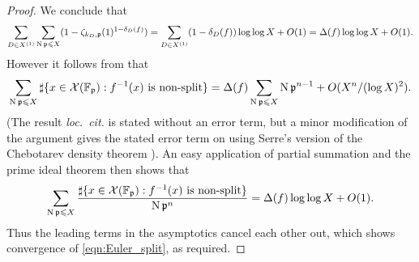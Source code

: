 \documentclass[a4paper,12pt,reqno]{amsart}
\numberwithin{equation}{section} \numberwithin{figure}{section}
\renewcommand{\O}{\mathcal{O}}
\newcommand\F{\mathbb{F}}
\renewcommand{\leq}{\leqslant}
\renewcommand{\#}{\sharp}
\newcommand{\fp}{\mathfrak{p}}
\theoremstyle{definition}
\newcommand{\dan}[1]{{\color{blue} \sf $\clubsuit\clubsuit\clubsuit$ Dan: [#1]}}
\numberwithin{lemma}{section}
\begin{document}
\begin{proof}
	We conclude that 
	$$\sum_{D \in X^{(1)}} \sum_{\Norm \fp \leq X} (1 - \zeta_{k_D,\fp}(1)^{1-\delta_D(f)})
	= \sum_{D \in X^{(1)}} (1 - \delta_D(f))\log \log X + O(1) =
	\Delta(f) \log \log X + O(1).$$
	However it follows from \cite[Prop.~3.10]{LS16} that
	$$\sum_{\Norm \fp \leq X}
	\#\{ x \in \mathcal{X}(\F_\fp) : f^{-1}(x) \text{ is non-split} \}
	= \Delta(f) \sum_{\Norm \fp \leq X} \Norm \fp^{n-1} + O(X^n/ (\log X)^2).$$
	(The result \emph{loc.~cit.} is stated without an error term, but a minor modification
	of the argument gives the stated error term on using Serre's version of the 
	Chebotarev density theorem \cite[Thm.~9.11]{Ser12}).
	An easy application of partial summation and the prime ideal theorem then shows 
	that
	$$\sum_{\Norm \fp \leq X}
	\frac{\#\{ x \in \mathcal{X}(\F_\fp) : f^{-1}(x) \text{ is non-split} \}}{\Norm \fp^n}
	= \Delta(f) \log \log X + O(1).$$
	Thus the leading terms in the asymptotics cancel each other out, which shows
	convergence of \eqref{eqn:Euler_split}, as required.	

\end{proof}
\end{document}
